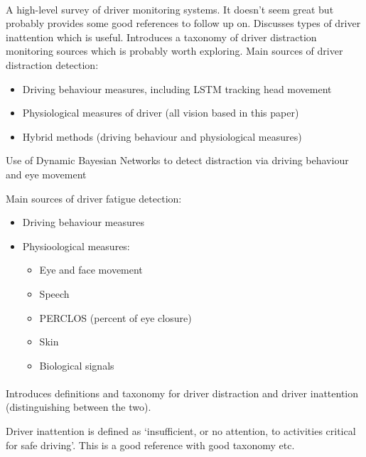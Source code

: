 \documentclass[11pt, parskip=half*,twoside=false]{scrbook}
\begin{document}
\paragraph{\citep{koesdwiadyRecentTrendsDriver2017}} A high-level survey of driver monitoring systems. It doesn't seem great but probably provides some good references to follow up on. Discusses types of driver inattention which is useful. Introduces a taxonomy of driver distraction monitoring sources which is probably worth exploring. Main sources of driver distraction detection:
\begin{itemize}
	\item Driving behaviour measures, including LSTM tracking head movement \citep{wollmerOnlineDriverDistraction2011}
	\item Physiological measures of driver (all vision based in this paper)
	\item Hybrid methods (driving behaviour and physiological measures)
\end{itemize}

Use of Dynamic Bayesian Networks to detect distraction via driving behaviour and eye movement \citep{liangHybridBayesianNetwork2014}

Main sources of driver fatigue detection:
\begin{itemize}
	\item Driving behaviour measures
	\item Physioological measures:
	\begin{itemize}
		\item Eye and face movement
		\item Speech
		\item PERCLOS (percent of eye closure)
		\item Skin \citep{kurianDrowsinessDetectionUsing2014a}
		\item Biological signals \citep{zhangAutomatedDetectionDriver2014}
	\end{itemize}
\end{itemize}

\paragraph{\citep{reganDriverDistractionDriver2011}} Introduces definitions and taxonomy for driver distraction and driver inattention (distinguishing between the two).

Driver inattention is defined as `insufficient, or no attention, to activities critical for safe driving'. This is a good reference with good taxonomy etc.
\end{document}
